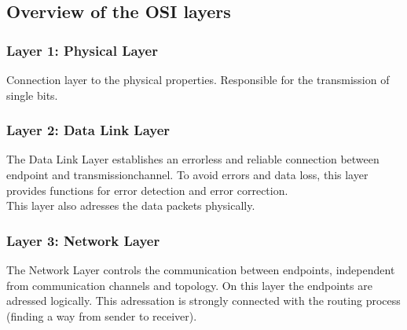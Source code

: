 \documentclass[a4paper]{book}%
\begin{document}
\subsection{Overview of the OSI layers}

\subsubsection{Layer 1: Physical Layer}
Connection layer to the physical properties. Responsible for the transmission of single bits.

\subsubsection{Layer 2: Data Link Layer} 
The Data Link Layer establishes an errorless and reliable connection between endpoint and transmissionchannel. To avoid errors and data loss, this layer provides functions for error detection and error correction.\\
This layer also adresses the data packets physically.

\subsubsection{Layer 3: Network Layer}
The Network Layer controls the communication between endpoints, independent from communication channels and topology. On this layer the endpoints are adressed logically. This adressation is strongly connected with the routing process (finding a way from sender to receiver).
\end{document}
